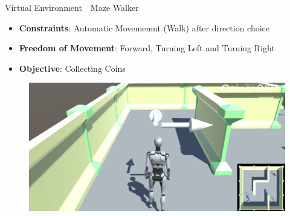 \begin{frame}{Virtual Environment~\textemdash{}~Maze Walker}
    \begin{minipage}[c]{.49\textwidth}
        \begin{itemize}
            \item \textbf{Constraints}: Automatic Movememnt (Walk) after direction choice
            \item \textbf{Freedom of Movement}: Forward, Turning Left and Turning Right
            \item \textbf{Objective}: Collecting Coins
        \end{itemize}    
    \end{minipage}
    \begin{minipage}[c]{.49\textwidth}
        \begin{figure}
            \centering
            \includegraphics[width=\textwidth]{figures/Methodology/maze}
        \end{figure}
    \end{minipage}
\end{frame}

